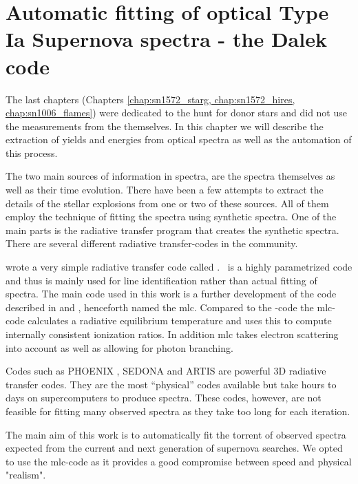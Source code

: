 \chapter{Automatic fitting of optical Type Ia Supernova spectra - the Dalek code}
\label{chap:dalek}

The last chapters (Chapters \ref{chap:sn1572_starg, chap:sn1572_hires, chap:sn1006_flames}) were dedicated to the hunt for donor stars and did not use the measurements from the \sneia themselves. In this chapter we will describe the extraction of yields and energies from optical spectra as well as the automation of this process.

The two main sources of information in spectra, are the spectra themselves as well as their time evolution. There have been a few attempts to extract the details of the stellar explosions from one or two of these sources. All of them employ the technique of fitting the spectra using synthetic spectra. One of the main parts is the radiative transfer program that creates the synthetic spectra. There are several different radiative transfer-codes in the community. 


\cite{2000PhDT.........6F} wrote a very simple radiative transfer code called \synow. \synow\ is a highly parametrized code and thus is mainly used for line identification rather than actual fitting of \snia spectra. 
The main code used in this work is a further development of the code described in  \citet{1993A&A...279..447M}  and \citet{2000A&A...363..705M}, henceforth named the \gls{mlc}. Compared to the \synow-code the \gls{mlc}-code calculates a radiative equilibrium temperature and uses this to compute internally consistent ionization ratios. In addition \gls{mlc} takes electron scattering into account as well as allowing for photon branching. 


Codes such as PHOENIX \cite{1999JCoAM.109...41H}, SEDONA \cite{2006ApJ...651..366K} and ARTIS \cite{2009MNRAS.398.1809K} are powerful 3D radiative transfer codes. They are the most ``physical'' codes available but take hours to days on supercomputers to produce spectra. These codes, however, are not feasible for fitting many observed spectra as they take too long for each iteration. 

The main aim of this work is to automatically fit the torrent of observed spectra expected from the current and next generation of supernova searches. We opted to use the \gls{mlc}-code as it provides a good compromise between speed and physical "realism". 

